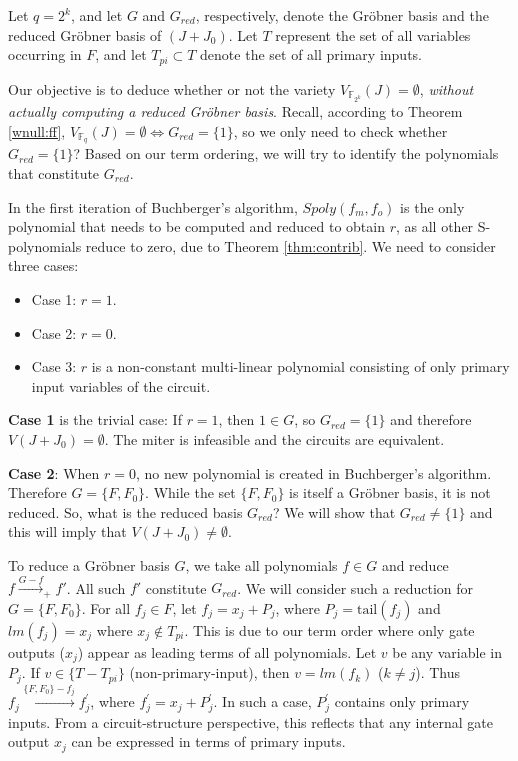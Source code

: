 \begin{Proof}
Let $q=2^k$, and let $G$ and $G_{red}$, respectively, denote the
Gr\"obner basis and the reduced Gr\"obner basis of $(J + J_0)$. Let
$T$ represent the set of all variables  occurring in $F$, and let
$T_{pi} \subset T$ denote the set of all primary inputs.   

Our objective is to deduce whether or not the variety
$V_{\mathbb{F}_{2^k}}(J)=\emptyset$, {\it without actually computing a
reduced Gr\"obner basis}. Recall, according to Theorem \ref{wnull:ff}, 
$V_{\mathbb{F}_{q}}(J)=\emptyset \iff G_{red}=\{1\}$, so we
only need to check whether $G_{red} =\{1\}$? Based on our term
ordering, we will try to identify the polynomials that constitute
$G_{red}$. 


In the first iteration of Buchberger's
algorithm, $Spoly(f_m,f_o)$ is the only polynomial that needs to be
computed and reduced to obtain $r$, as all other S-polynomials reduce
to zero, due to Theorem \ref{thm:contrib}. We need to consider three
cases: 

\begin{itemize}
\item Case 1: $r = 1$.
\item Case 2: $r = 0$.
\item Case 3: $r$ is a  non-constant multi-linear polynomial
  consisting of only primary input variables of the circuit.
\end{itemize}

{\bf Case 1} is the trivial case: If $r = 1$, then $1\in G$, so
$G_{red} = \{1\}$ and therefore $V(J + J_0) = \emptyset$. The
miter is infeasible and the circuits are equivalent.

{\bf Case 2}: When $r = 0$, no new polynomial is created in
Buchberger's algorithm. Therefore $G = \{F, F_0\}$.
While the set $\{F, F_0\}$ is itself a Gr\"obner basis, it is not
reduced. So, what is the reduced basis $G_{red}$? We will show that
$G_{red} \neq \{1\}$ and this will imply that $V(J + J_0) \neq
\emptyset$.  

To reduce a Gr\"obner basis $G$, we take all polynomials $f \in G$ and
reduce $f\stackrel{G - f}{\longrightarrow}_+ f'$. All such $f'$
constitute $G_{red}$. We will consider such a reduction for $G = \{F,
F_0\}$. For all $f_j \in F$, let $f_j = x_j +P_j$, where 
$P_j = \text{tail}(f_j)$ and $lm(f_j)=x_j$ where $x_j \notin
T_{pi}$. This is due to our term order where only gate outputs ($x_j$)
appear as leading terms of all polynomials. Let $v$ be any variable
in $P_j$. If $v\in \{T-T_{pi}\}$ (non-primary-input), then $v=lm(f_k)$ 
($k\neq j$).  Thus $f_j \xrightarrow{ \{F,F_0\}-f_j }{f_j^{'}}$, where
$f_j^{'}=x_j+P_j^{'}$.  In such a case, $P_j^{'}$ contains only
primary inputs.  From a circuit-structure perspective,
this reflects that any internal gate output $x_j$ can be expressed in
terms of primary inputs.


\end{Proof}
